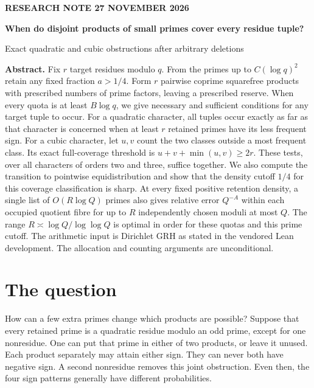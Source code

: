 \documentclass[11pt,letterpaper]{article}
\begin{document}
\thispagestyle{plain}
{\noindent\sffamily\small\bfseries\color{accent} RESEARCH NOTE \hfill 27 NOVEMBER 2026\par}
\vspace{12pt}
{\raggedright\noindent\Huge\bfseries When do disjoint products of small primes cover every residue tuple?\par}
\vspace{8pt}
{\noindent\large\color{accent} Exact quadratic and cubic obstructions after arbitrary deletions\par}
\vspace{13pt}
\noindent\textbf{Abstract.}
Fix \(r\) target residues modulo \(q\). From the primes up to \(C(\log q)^2\) retain any fixed fraction \(a>1/4\). Form \(r\) pairwise coprime squarefree products with prescribed numbers of prime factors, leaving a prescribed reserve. When every quota is at least \(B\log q\), we give necessary and sufficient conditions for any target tuple to occur.
For a quadratic character, all tuples occur exactly as far as that character is concerned when at least \(r\) retained primes have its less frequent sign. For a cubic character, let \(u,v\) count the two classes outside a most frequent class. Its exact full-coverage threshold is \(u+v+\min(u,v)\ge 2r\). These tests, over all characters of orders two and three, suffice together. We also compute the transition to pointwise equidistribution and show that the density cutoff \(1/4\) for this coverage classification is sharp. At every fixed positive retention density, a single list of \(O(R\log Q)\) primes also gives relative error \(Q^{-A}\) within each occupied quotient fibre for up to \(R\) independently chosen moduli at most \(Q\). The range \(R\asymp\log Q/\log\log Q\) is optimal in order for these quotas and this prime cutoff. The arithmetic input is Dirichlet GRH as stated in the vendored Lean development. The allocation and counting arguments are unconditional.

\section{The question}
How can a few extra primes change which products are possible? Suppose that every retained prime is a quadratic residue modulo an odd prime, except for one nonresidue. One can put that prime in either of two products, or leave it unused. Each product separately may attain either sign. They can never both have negative sign. A second nonresidue removes this joint obstruction. Even then, the four sign patterns generally have different probabilities.
\end{document}
